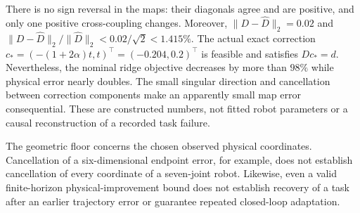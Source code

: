 There is no sign reversal in the maps: their diagonals agree and are
positive, and only one positive cross-coupling changes. Moreover,
$\|D-\widehat D\|_2=0.02$ and
$\|D-\widehat D\|_2/\|\widehat D\|_2<0.02/\sqrt2<1.415\%$.
The actual exact correction $c_*=(-(1+2\alpha)t,t)^\top=(-0.204,0.2)^\top$
is feasible and satisfies $Dc_*=d$. Nevertheless, the nominal ridge
objective decreases by more than $98\%$ while physical error nearly doubles.
The small singular direction and cancellation between correction components
make an apparently small map error consequential. These are constructed
numbers, not fitted robot parameters or a causal reconstruction of a recorded
task failure.

The geometric floor concerns the chosen observed physical coordinates.
Cancellation of a six-dimensional endpoint error, for example, does not
establish cancellation of every coordinate of a seven-joint robot. Likewise,
even a valid finite-horizon physical-improvement bound does not establish
recovery of a task after an earlier trajectory error or guarantee repeated
closed-loop adaptation.
